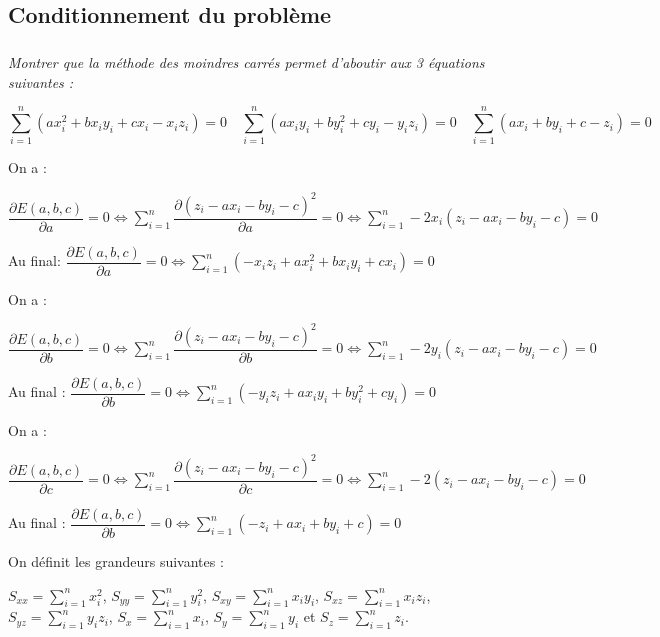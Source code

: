 \subsection{Conditionnement du problème}

\subparagraph{}
\textit{Montrer que la méthode des moindres carrés permet d'aboutir aux 3 équations suivantes :}

$$
\sum\limits_{i=1}^n \left(ax_i^2 + bx_i y_i  +c x_i -x_i z_i  \right) = 0 \quad 
\sum\limits_{i=1}^n  \left(ax_iy_i  + by_i^2 +cy_i -y_i z_i  \right) = 0 \quad 
\sum\limits_{i=1}^n  \left(ax_i +  by_i+c -z_i  \right) = 0
$$

\ifprof
\begin{corrige}

On a : 

$\dfrac{\partial E(a,b,c)}{\partial a} = 0 
\Leftrightarrow  \sum\limits_{i=1}^{n} \dfrac{\partial \left(z_i -ax_i -by_i -c\right)^2}{\partial a}  = 0
\Leftrightarrow   \sum\limits_{i=1}^{n} -2x_i  \left(z_i -ax_i -by_i -c\right)  = 0
$

Au final:  $\dfrac{\partial E(a,b,c)}{\partial a} = 0 
\Leftrightarrow   \sum\limits_{i=1}^{n}   \left(-x_iz_i +ax_i^2 +bx_i y_i +cx_i\right) = 0$

On a :

$\dfrac{\partial E(a,b,c)}{\partial b} = 0
\Leftrightarrow \sum\limits_{i=1}^{n} \dfrac{\partial \left(z_i -ax_i -by_i -c\right)^2}{\partial b}  =0 
\Leftrightarrow \sum\limits_{i=1}^{n} -2y_i  \left(z_i -ax_i -by_i -c\right) = 0
$

Au final : $\dfrac{\partial E(a,b,c)}{\partial b} = 0 
\Leftrightarrow   \sum\limits_{i=1}^{n}     \left(-y_iz_i + ax_i y_i  +by_i^2 +cy_i\right)  = 0$


On a :

$\dfrac{\partial E(a,b,c)}{\partial c} = 0
\Leftrightarrow \sum\limits_{i=1}^{n} \dfrac{\partial \left(z_i -ax_i -by_i -c\right)^2}{\partial c}  =0 
\Leftrightarrow \sum\limits_{i=1}^{n} -2  \left(z_i -ax_i -by_i -c\right) = 0
$

Au final : $\dfrac{\partial E(a,b,c)}{\partial b} = 0 
\Leftrightarrow   \sum\limits_{i=1}^{n}  \left(-z_i +ax_i +by_i +c\right) = 0$

\end{corrige}

\else
\fi

\vspace{.5cm}
On définit les grandeurs suivantes : 

$S_{xx} = \sum\limits_{i=1}^n x_i^2$, $S_{yy} = \sum\limits_{i=1}^n y_i^2$, $S_{xy} = \sum\limits_{i=1}^n x_i y_i$, $S_{xz} = \sum\limits_{i=1}^n x_i z_i$, $S_{yz} = \sum\limits_{i=1}^n y_i z_i$, 
$S_x  = \sum\limits_{i=1}^n  x_i$, $S_y  = \sum\limits_{i=1}^n  y_i$ et $S_z  = \sum\limits_{i=1}^n  z_i $.

